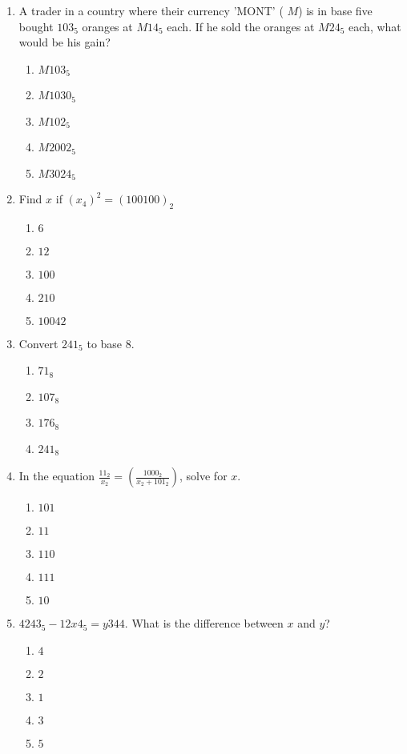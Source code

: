 \begin{multicols}{2}
\begin{enumerate}[label={\arabic*.}]
\item A trader in a country where their currency 'MONT' ( \(M\)) is in base five bought \(103_5\) oranges at \(M14_5\) each. If he sold the oranges at \(M24_5\) each, what would be his gain?
  \begin{enumerate}[label={\Alph*.}]
    \item \(M103_5\)
    \item \(M1030_5\)
    \item \(M102_5\)
    \item \(M2002_5\)
    \item \(M3024_5\)
  \end{enumerate}
  
\item Find \(x\) if \((x_{4})^2 = (100100)_{2}\)
	\begin{enumerate}[label={\Alph*.}]
	\item \(6\)
	\item \(12\)
	\item \(100\)
	\item \(210\)
 	\item \(10042\)
	\end{enumerate}
 
\item Convert \(241_5\) to base \(8\).
	\begin{enumerate}[label={\Alph*.}]
	\item \(71_8\)
	\item \(107_8\)
	\item \(176_8\)
	\item \(241_8\)
	\end{enumerate}
 
\item In the equation \(\frac{11_2}{x_2}  = (\frac{1000_2}{{x}_2 + {101}_{2}})\), solve for \(x\).  
	\begin{enumerate}[label={\Alph*.}]
	\item \(101\)
	\item \(11\)
	\item \(110\)
	\item \(111\)
 	\item \(10\)
	\end{enumerate}
 
\item  \({4243}_5 - {12x4}_5 = y344\). What is the difference between \(x\) and \(y\)?
	\begin{enumerate}[label={\Alph*.}]
	\item \(4\)
	\item \(2\)
	\item \(1\)
	\item \(3\)
 	\item \(5\)
	\end{enumerate}
 

\end{enumerate}
\end{multicols}

